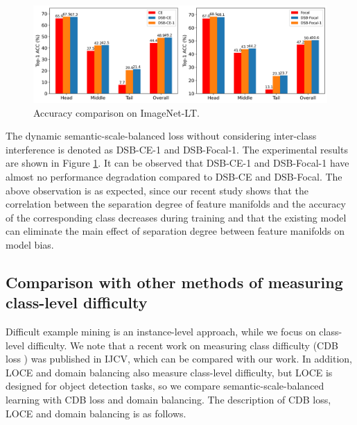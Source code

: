 \documentclass[10pt]{article} %
\begin{document}
\begin{figure}[h] %
\begin{center}
\vskip -0.05in
\includegraphics[width=1\columnwidth]{fig21}
\vskip -0.1in
\caption{Accuracy comparison on ImageNet-LT.}
\label{fig21}
\end{center}
\vskip -0.1in
\end{figure}

The dynamic semantic-scale-balanced loss without considering inter-class interference is denoted as DSB-CE-1 and DSB-Focal-1. The experimental results are shown in Figure \ref{fig21}. It can be observed that DSB-CE-1 and DSB-Focal-1 have almost no performance degradation compared to DSB-CE and DSB-Focal. The above observation is as expected, since our recent study shows that the correlation between the separation degree of feature manifolds and the accuracy of the corresponding class decreases during training and that the existing model can eliminate the main effect of separation degree between feature manifolds on model bias.

\subsection{Comparison with other methods of measuring class-level difficulty\label{H.2}}

Difficult example mining \cite{paper113,paper114} is an instance-level approach, while we focus on class-level difficulty. We note that a recent work on measuring class difficulty (CDB loss \cite{paper27}) was published in IJCV, which can be compared with our work. In addition, LOCE \cite{paper112} and domain balancing \cite{paper111} also measure class-level difficulty, but LOCE is designed for object detection tasks, so we compare semantic-scale-balanced learning with CDB loss and domain balancing. The description of CDB loss, LOCE and domain balancing is as follows.
\end{document}
